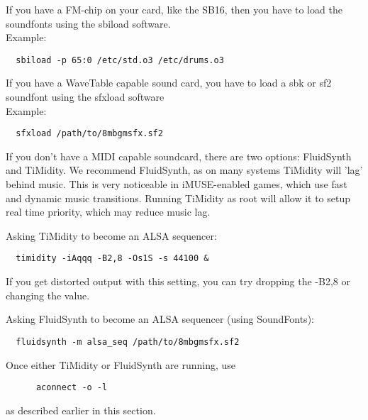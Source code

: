 If you have a FM-chip on your card, like the SB16, then you have to load
the soundfonts using the sbiload software. \\
Example:
\begin{verbatim}
  sbiload -p 65:0 /etc/std.o3 /etc/drums.o3
\end{verbatim}
%
If you have a WaveTable capable sound card, you have to load a sbk or sf2
soundfont using the sfxload software\\
Example:
\begin{verbatim}
  sfxload /path/to/8mbgmsfx.sf2
\end{verbatim}
%
If you don't have a MIDI capable soundcard, there are two options: FluidSynth
and TiMidity. We recommend FluidSynth, as on many systems TiMidity will 'lag'
behind music. This is very noticeable in iMUSE-enabled games, which use fast
and dynamic music transitions. Running TiMidity as root will allow it to
setup real time priority, which may reduce music lag.

Asking TiMidity to become an ALSA sequencer:
\begin{verbatim}
  timidity -iAqqq -B2,8 -Os1S -s 44100 &
\end{verbatim}
If you get distorted output with this setting, you can try dropping the 
-B2,8 or changing the value.

Asking FluidSynth to become an ALSA sequencer (using SoundFonts):
\begin{verbatim}
  fluidsynth -m alsa_seq /path/to/8mbgmsfx.sf2
\end{verbatim}
%
Once either TiMidity or FluidSynth are running, use
\begin{verbatim}
      aconnect -o -l
\end{verbatim}
as described earlier in this section.
